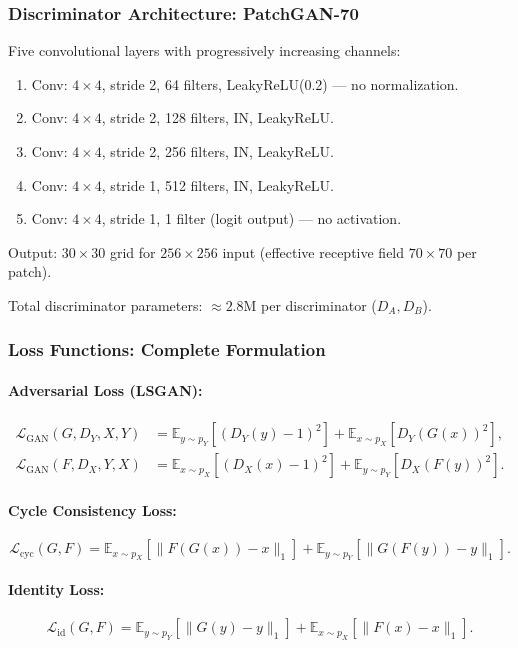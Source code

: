 \documentclass[11pt]{article}
\begin{document}
\subsubsection{Discriminator Architecture: PatchGAN-70}
Five convolutional layers with progressively increasing channels:
\begin{enumerate}
\item Conv: $4 \times 4$, stride 2, 64 filters, LeakyReLU(0.2) — no normalization.
\item Conv: $4 \times 4$, stride 2, 128 filters, IN, LeakyReLU.
\item Conv: $4 \times 4$, stride 2, 256 filters, IN, LeakyReLU.
\item Conv: $4 \times 4$, stride 1, 512 filters, IN, LeakyReLU.
\item Conv: $4 \times 4$, stride 1, 1 filter (logit output) — no activation.
\end{enumerate}
Output: $30 \times 30$ grid for $256 \times 256$ input (effective receptive field $70 \times 70$ per patch).

Total discriminator parameters: $\approx 2.8$M per discriminator ($D_A, D_B$).

\subsubsection{Loss Functions: Complete Formulation}
\paragraph{Adversarial Loss (LSGAN):}
\begin{align}
\mathcal{L}_{\text{GAN}}(G, D_Y, X, Y) &= \mathbb{E}_{y \sim p_Y}[(D_Y(y) - 1)^2] + \mathbb{E}_{x \sim p_X}[D_Y(G(x))^2], \\
\mathcal{L}_{\text{GAN}}(F, D_X, Y, X) &= \mathbb{E}_{x \sim p_X}[(D_X(x) - 1)^2] + \mathbb{E}_{y \sim p_Y}[D_X(F(y))^2].
\end{align}

\paragraph{Cycle Consistency Loss:}
\begin{equation}
\mathcal{L}_{\text{cyc}}(G, F) = \mathbb{E}_{x \sim p_X}[\|F(G(x)) - x\|_1] + \mathbb{E}_{y \sim p_Y}[\|G(F(y)) - y\|_1].
\end{equation}

\paragraph{Identity Loss:}
\begin{equation}
\mathcal{L}_{\text{id}}(G, F) = \mathbb{E}_{y \sim p_Y}[\|G(y) - y\|_1] + \mathbb{E}_{x \sim p_X}[\|F(x) - x\|_1].
\end{equation}
\end{document}

